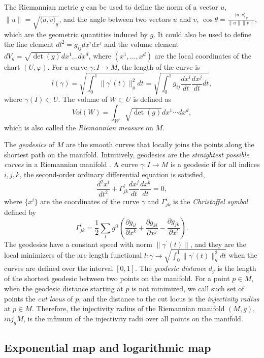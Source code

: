 \documentclass[11pt,a4paper,]{article}
\begin{document}
The Riemannian metric \(g\) can be used to define the norm of a vector \(u\), \(\|u\| = \sqrt{\langle u,v \rangle_g}\), and the angle between two vectors \(u\) and \(v\), \(\cos\theta = \frac{\langle u,v \rangle_g}{\|u\| \|v\|}\), which are the geometric quantities induced by \(g\). It could also be used to define the line element \(dl^2 = g_{ij}dx^i dx^j\) and the volume element \(dV_g = \sqrt{\det(g)}dx^1 \dots dx^d\), where \((x^1,\dots,x^d)\) are the local coordinates of the chart \((U, \varphi)\).
For a curve \(\gamma: I \rightarrow M\), the length of the curve is
\[
l(\gamma) = \sqrt{\int_0^1 \|\gamma^\prime(t)\|^2_g dt} = \sqrt{\int_0^1 g_{ij} \frac{dx^i}{dt} \frac{dx^j}{dt} dt},
\]
where \(\gamma(I) \subset U\). The volume of \(W \subset U\) is defined as
\[
Vol(W) = \int_W \sqrt{\det(g)}dx^1 \cdots dx^d,
\]
which is also called the \emph{Riemannian measure} on \(M\).

The \emph{geodesics} of \(M\) are the smooth curves that locally joins the points along the shortest path on the manifold. Intuitively, geodesics are the \emph{straightest possible curves} in a Riemannian manifold \autocite[Section 7.2.3 of][]{Nakahara2018-zs}.
A curve \(\gamma: I \rightarrow M\) is a geodesic if for all indices \(i,j,k\), the second-order ordinary differential equation is satisfied,
\[
\frac{d^2 x^i}{dt^2} + \Gamma^i_{jk} \frac{d x^j}{dt} \frac{dx^k}{dt} = 0,
\]
where \(\{x^i\}\) are the coordinates of the curve \(\gamma\) and \(\Gamma^i_{jk}\) is the \emph{Christoffel symbol} defined by
\[
\Gamma^i_{jk} = \frac{1}{2} \sum_l g^{il} (\frac{\partial g_{il}}{\partial x^k} 
+ \frac{\partial g_{kl}}{\partial x^j} - \frac{\partial g_{jk}}{\partial x^l}).
\]
The geodesics have a constant speed with norm \(\| \gamma^\prime(t) \|\), and they are the local minimizers of the arc
length functional \(l:\gamma \rightarrow \sqrt{\int_0^1 \| \gamma^\prime(t) \|_g^2 dt}\) when the curves are defined over the interval \([0,1]\).
The \emph{geodesic distance} \(d_g\) is the length of the shortest geodesic between two points on the manifold. For a point \(p \in M\), when the geodesic distance starting at \(p\) is not minimized, we call such set of points the \emph{cut locus} of \(p\), and the distance to the cut locus is the \emph{injectivity radius} at \(p \in M\). Therefore, the injectivity radius of the Riemannian manifold \((M,g)\), \(\textit{inj}_gM\), is the infimum of the injectivity radii over all points on the manifold.

\hypertarget{exponential-map-and-logarithmic-map}{%
\subsection{Exponential map and logarithmic map}\label{exponential-map-and-logarithmic-map}}
\end{document}

